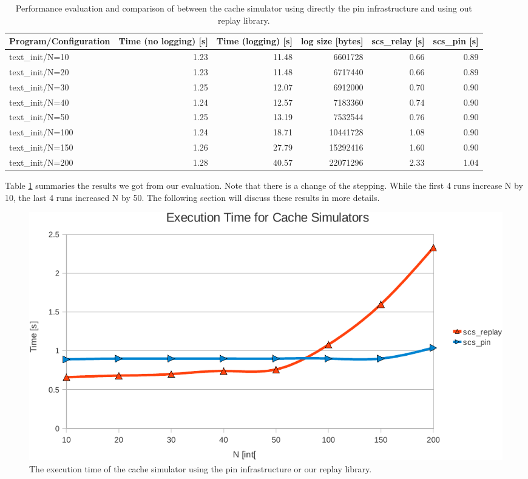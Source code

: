 \begin{table}
  \begin{tabularx}{\textwidth}{X r r r r r}
    \toprule
    Program/Configuration & Time (no logging) [s] & Time (logging) [s] & log size [bytes] & scs\_relay [s] & scs\_pin [s]\\
    \midrule
    \addlinespace[1mm]
    \rowcolor[gray]{.9}
    text\_init/N=10   & 1.23 & 11.48 &  6601728 & 0.66 & 0.89 \\
    \addlinespace[1mm]
    text\_init/N=20   & 1.23 & 11.48 &  6717440 & 0.66 & 0.89 \\ 
    \addlinespace[1mm]
    \rowcolor[gray]{.9}
    text\_init/N=30   & 1.25 & 12.07 &  6912000 & 0.70 & 0.90 \\
    \addlinespace[1mm]
    text\_init/N=40   & 1.24 & 12.57 &  7183360 & 0.74 & 0.90 \\
    \addlinespace[1mm]
    \rowcolor[gray]{.9}
    text\_init/N=50   & 1.25 & 13.19 &  7532544 & 0.76 & 0.90 \\
    \addlinespace[1mm]
    text\_init/N=100  & 1.24 & 18.71 & 10441728 & 1.08 & 0.90 \\
    \addlinespace[1mm]
    \rowcolor[gray]{.9}
    text\_init/N=150  & 1.26 & 27.79 & 15292416 & 1.60 & 0.90 \\
    \addlinespace[1mm]
    text\_init/N=200  & 1.28 & 40.57 & 22071296 & 2.33 & 1.04 \\
    \bottomrule
  \end{tabularx}
  \caption{Performance evaluation and comparison of between the cache
    simulator using directly the pin infrastructure and using out
    replay library.}
  \label{tbl:results}
\end{table}

Table \ref{tbl:results} summaries the results we got from our
evaluation. Note that there is a change of the stepping. While the
first 4 runs increase N by 10, the last 4 runs increased N by 50. The
following section will discuss these results in more details.

\begin{figure}
  \includegraphics[width=\columnwidth]{eval_execution_time_replay}
  \caption{The execution time of the cache simulator using the pin
    infrastructure or our replay library.}
  \label{fig:eval_execution_time_replay}
\end{figure}


